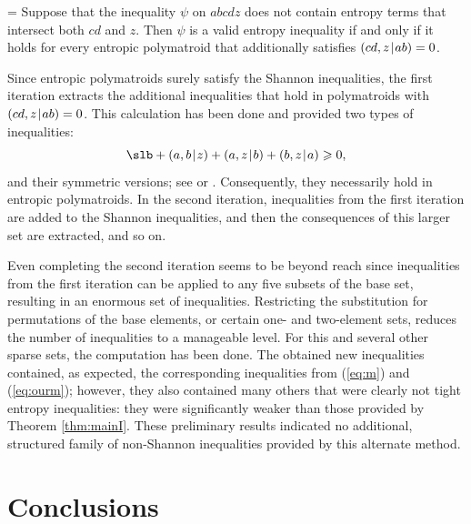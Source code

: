 \documentclass[reqno]{amsart}
\theoremstyle{definition}
\def\|{\mkern1.5mu{|}\mkern1.5mu}
\renewcommand\ge{\geqslant}\renewcommand\le{\leqslant}
\begin{document}
\smallskip\hangindent=\parindent
Suppose that the inequality $\psi$ on $abcdz$ does not contain entropy terms
that intersect both $cd$ and $z$. Then $\psi$ is a valid entropy inequality
if and only if it holds for every entropic polymatroid that additionally
satisfies $(cd,z\|ab)=0$.

\smallskip
\noindent
Since entropic polymatroids surely satisfy the Shannon inequalities, the
first iteration extracts the additional inequalities that hold in
polymatroids with $(cd,z\|ab)=0$. This calculation has been done and
provided two types of inequalities:
$$
    \slb+(a,b\|z)+(a,z\|b)+(b,z\|a) \ge 0,
$$
and their symmetric versions; see \cite{Csirmaz.oneadhesive} or
\cite{M.fmadhe}. Consequently, they necessarily hold in entropic
polymatroids. In the second iteration, inequalities from the first iteration
are added to the Shannon inequalities, and then the consequences of this
larger set are extracted, and so on.

Even completing the second iteration seems to be beyond reach since
inequalities from the first iteration can be applied to any five subsets of
the base set, resulting in an enormous set of inequalities. Restricting the
substitution for permutations of the base elements, or certain one- and
two-element sets, reduces the number of inequalities to a manageable level.
For this and several other sparse sets, the computation has been done. The
obtained new inequalities contained, as expected, the corresponding
inequalities from (\ref{eq:m}) and (\ref{eq:ourm}); however, they also
contained many others that were clearly not tight entropy inequalities: they
were significantly weaker than those provided by Theorem \ref{thm:mainI}.
These preliminary results indicated no additional, structured family of
non-Shannon inequalities provided by this alternate method.


\section{Conclusions}\label{sec:final}
\end{document}
